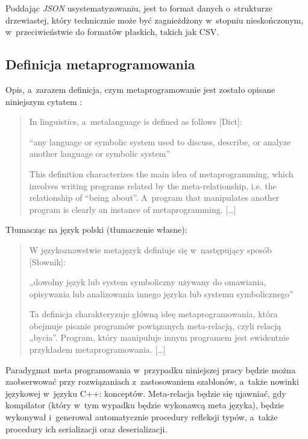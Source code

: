 \documentclass[12pt]{article}
\newcommand{\n}{\newline}
\newcommand{\nonpl}[1]{{\it #1}}
\newcommand{\JSON}{\nonpl{JSON} }
\begin{document}
{{			Poddając \JSON usystematyzowaniu, jest to format danych o~strukturze drzewiastej, który technicznie
			może być zagnieżdżony w~stopniu nieskończonym, w~przeciwieństwie do formatów płaskich, takich jak CSV.\n
		}

		{
			\subsection{Definicja metaprogramowania}

			Opis, a~zarazem definicja, czym metaprogramowanie jest zostało opisane niniejszym cytatem \cite{metaprogramming_definition}:

			\begin{quotation}
					In linguistics, a~metalanguage is defined as follows [Dict]:\n

				“any language or symbolic system used to discuss, describe, or analyze another
					language or symbolic system”\n

					This definition characterizes the main idea of metaprogramming, which involves writing
				programs related by the meta-relationship, i.e. the relationship of “being about”. A~program that
				manipulates another program is clearly an instance of metaprogramming. [\ldots]
			\end{quotation}

			\newpage
			{\noindent Tłumacząc na język polski (tłumaczenie własne):}

			\begin{quotation}
					W językoznawstwie metajęzyk definiuje się w~następujący sposób [Słownik]:\n

				„dowolny język lub system symboliczny używany do omawiania, opisywania lub analizowania
					innego języka lub systemu symbolicznego”\n

					Ta definicja charakteryzuje główną ideę metaprogramowania, która obejmuje pisanie
				programów powiązanych meta-relacją, czyli relacją „bycia”. Program, który
				manipuluje innym programem jest ewidentnie przykładem metaprogramowania. [\ldots]
			\end{quotation}

			Paradygmat meta programowania w~przypadku niniejszej pracy będzie można zaobserwować przy
			rozwiązaniach z~zastosowaniem szablonów, a~także nowinki językowej w~języku C++: konceptów.
			Meta-relacja będzie się ujawniać, gdy kompilator (który w~tym wypadku będzie wykonawcą meta języka),
			będzie wykonywał i~generował automatycznie procedury refleksji typów, a~także procedury ich serializacji
			oraz deserializacji.\n
		}

}
\end{document}
